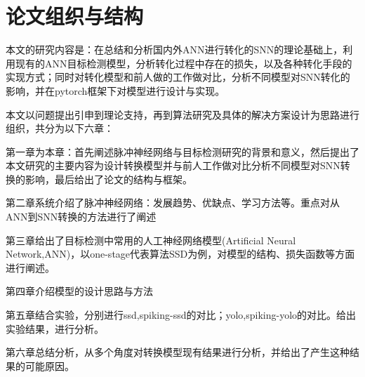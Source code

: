 \section{论文组织与结构}
\par
本文的研究内容是：在总结和分析国内外ANN进行转化的SNN的理论基础上，利用现有的ANN目标检测模型，分析转化过程中存在的损失，以及各种转化手段的实现方式；同时对转化模型和前人做的工作做对比，分析不同模型对SNN转化的影响，并在pytorch框架下对模型进行设计与实现。
\par
本文以问题提出引申到理论支持，再到算法研究及具体的解决方案设计为思路进行组织，共分为以下六章：
\par
第一章为本章：首先阐述脉冲神经网络与目标检测研究的背景和意义，然后提出了本文研究的主要内容为设计转换模型并与前人工作做对比分析不同模型对SNN转换的影响，最后给出了论文的结构与框架。
\par
第二章系统介绍了脉冲神经网络：发展趋势、优缺点、学习方法等。重点对从ANN到SNN转换的方法进行了阐述
\par
第三章给出了目标检测中常用的人工神经网络模型(Artificial Neural Network,ANN)，以one-stage代表算法SSD为例，对模型的结构、损失函数等方面进行阐述。
\par
第四章介绍模型的设计思路与方法
\par
第五章结合实验，分别进行ssd,spiking-ssd的对比；yolo,spiking-yolo的对比。给出实验结果，进行分析。
\par
第六章总结分析，从多个角度对转换模型现有结果进行分析，并给出了产生这种结果的可能原因。